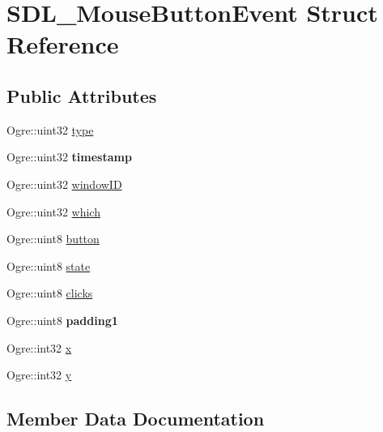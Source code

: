\hypertarget{struct_s_d_l___mouse_button_event}{}\section{S\+D\+L\+\_\+\+Mouse\+Button\+Event Struct Reference}
\label{struct_s_d_l___mouse_button_event}
\subsection*{Public Attributes}
\begin{DoxyCompactItemize}
\item 
Ogre\+::uint32 \hyperlink{struct_s_d_l___mouse_button_event_a07300180f63abeecc56b0358525b096e}{type}
\item 
\mbox{\label{struct_s_d_l___mouse_button_event_a8fa7ed510a9dbe6fa8380ee2d3366e08}} 
Ogre\+::uint32 {\bfseries timestamp}
\item 
Ogre\+::uint32 \hyperlink{struct_s_d_l___mouse_button_event_a41a4397c3620630c895d6be7a17090bd}{window\+ID}
\item 
Ogre\+::uint32 \hyperlink{struct_s_d_l___mouse_button_event_af4fca7a7a624a906d9afae4316de199d}{which}
\item 
Ogre\+::uint8 \hyperlink{struct_s_d_l___mouse_button_event_ad6da062cd45b2482193e7faac482ca20}{button}
\item 
Ogre\+::uint8 \hyperlink{struct_s_d_l___mouse_button_event_a8d000517d2f23e7577e35bb8c0ef803a}{state}
\item 
Ogre\+::uint8 \hyperlink{struct_s_d_l___mouse_button_event_a35097491b084107fccb5cc014361d3d6}{clicks}
\item 
\mbox{\label{struct_s_d_l___mouse_button_event_a2b7ee1562f759ffcc415fb34c03a31a0}} 
Ogre\+::uint8 {\bfseries padding1}
\item 
Ogre\+::int32 \hyperlink{struct_s_d_l___mouse_button_event_aeb46064b59c44d7432356d9323e6c877}{x}
\item 
Ogre\+::int32 \hyperlink{struct_s_d_l___mouse_button_event_a811a7cc2e78a8740efed1bc6bb316819}{y}
\end{DoxyCompactItemize}


\subsection{Member Data Documentation}
\mbox{\label{struct_s_d_l___mouse_button_event_ad6da062cd45b2482193e7faac482ca20}} 
